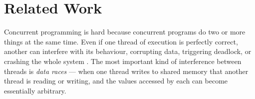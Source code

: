 \section{Related Work}
	



Concurrent programming is hard \cite{lea98,concurrentHard}
%
%
%
because concurrent programs do two or more things at the same
time. Even if one thread of execution is perfectly correct, another
can interfere with its behaviour, corrupting data, triggering
deadlock, or crashing the whole system \cite{fonesca2010}.
%
%
The most important kind of interference between threads is
\textit{data races} --- when one thread writes to shared memory that
another thread is reading or writing,
%
and the values accessed by each can become essentially arbitrary.
%
%
%
%
%
%
%
%
